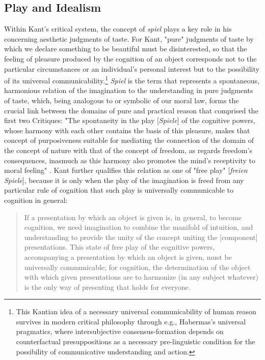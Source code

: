 \subsection*{Play and Idealism}
Within Kant's critical system, the concept of \emph{spiel} plays a key role in his  concerning aesthetic judgments of taste. For Kant, "pure" judgments of taste by which we declare something to be beautiful must be disinterested, so that the feeling of pleasure produced by the cognition of an object corresponds not to the particular circumstances or an individual's personal interest but to the possibility of its universal communicability.\footnote{
  This Kantian idea of a necessary universal communicability of human reason survives in modern critical philosophy through e.g., Habermas's universal pragmatics, where intersubjective consensus-formation depends on counterfactual presuppositions as a necessary pre-linguistic condition for the possibility of communicative understanding and action.
  }
\emph{Spiel} is the term that represents a spontaneous, harmonious relation of the imagination to the understanding in pure judgments of taste, which, being analogous to or symbolic of our moral law, forms the crucial link between the domains of pure and practical reason that comprised the first two Critiques: "The spontaneity in the play [\emph{Spiele}] of the cognitive powers, whose harmony with each other contains the basis of this pleasure, makes that concept of purposiveness suitable for mediating the connection of the domain of the concept of nature with that of the concept of freedom, as regards freedom's consequences, inasmuch as this harmony also promotes the mind's receptivity to moral feeling" \autocite[37-8]{Kant1987-coj}. Kant further qualifies this relation as one of "free play" [\emph{freien Spiele}], because it is only when the play of the imagination is freed from any particular rule of cognition that such play is universally communicable to cognition in general:
\blockcquote[62]{Kant1987-coj}{
  If a presentation by which an object is given is, in general, to become cognition, we need imagination to combine the manifold of intuition, and understanding to provide the unity of the concept uniting the [component] presentations. This state of free play of the cognitive powers, accompanying a presentation by which an object is given, must be universally communicable; for cognition, the determination of the object with which given presentations are to harmonize (in any subject whatever) is the only way of presenting that holds for everyone.
  }
